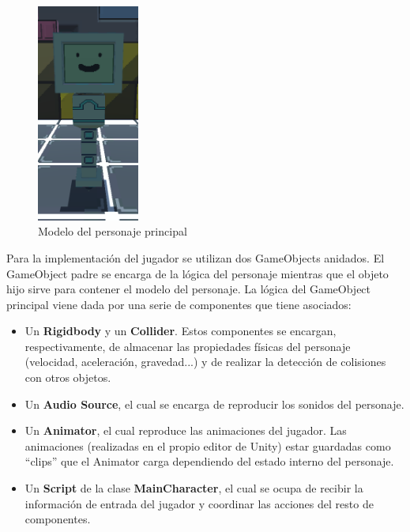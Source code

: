 \begin{figure}[h]
	\includegraphics[width=0.30\textwidth]{images/estructura/fisica/flick_happy_small}
	\centering
	\caption{Modelo del personaje principal}
\end{figure}

Para la implementación del jugador se utilizan dos GameObjects anidados. El GameObject padre se encarga de la lógica del personaje mientras que el objeto hijo sirve para contener el modelo del personaje. La lógica del GameObject principal viene dada por una serie de componentes que tiene asociados: 
\begin{itemize}
	\item Un \textbf{Rigidbody} y un \textbf{Collider}. Estos componentes se encargan, respectivamente, de almacenar las propiedades físicas del personaje (velocidad, aceleración, gravedad...) y de realizar la detección de colisiones con otros objetos.
	\item Un \textbf{Audio Source}, el cual se encarga de reproducir los sonidos del personaje.
	\item Un \textbf{Animator}, el cual reproduce las animaciones del jugador. Las animaciones (realizadas en el propio editor de Unity) estar guardadas como ``clips'' que el Animator carga dependiendo del estado interno del personaje.
	\item Un \textbf{Script} de la clase \textbf{MainCharacter}, el cual se ocupa de recibir la información de entrada del jugador y coordinar las acciones del resto de componentes.
\end{itemize}


